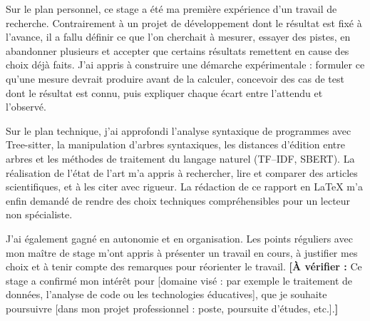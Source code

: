 \documentclass[12pt,a4paper,oneside]{report}
\newcommand{\averifier}[1]{\textcolor{orange!85!black}{\textbf{[À vérifier :} #1\textbf{]}}}
\begin{document}
Sur le plan personnel, ce stage a été ma première expérience d'un travail de
recherche. Contrairement à un projet de développement dont le résultat est
fixé à l'avance, il a fallu définir ce que l'on cherchait à mesurer, essayer
des pistes, en abandonner plusieurs et accepter que certains résultats
remettent en cause des choix déjà faits. J'ai appris à construire une
démarche expérimentale : formuler ce qu'une mesure devrait produire avant
de la calculer, concevoir des cas de test dont le résultat est connu, puis
expliquer chaque écart entre l'attendu et l'observé.

Sur le plan technique, j'ai approfondi l'analyse syntaxique de programmes
avec Tree-sitter, la manipulation d'arbres syntaxiques, les distances
d'édition entre arbres et les méthodes de traitement du langage naturel
(TF--IDF, SBERT). La réalisation de l'état de l'art m'a appris à rechercher,
lire et comparer des articles scientifiques, et à les citer avec rigueur.
La rédaction de ce rapport en \LaTeX{} m'a enfin demandé de rendre des
choix techniques compréhensibles pour un lecteur non spécialiste.

J'ai également gagné en autonomie et en organisation. Les points réguliers
avec mon maître de stage m'ont appris à présenter un travail en cours, à
justifier mes choix et à tenir compte des remarques pour réorienter le
travail. \averifier{Ce stage a confirmé mon intérêt pour [domaine visé :
par exemple le traitement de données, l'analyse de code ou les
technologies éducatives], que je souhaite poursuivre [dans mon projet
professionnel : poste, poursuite d'études, etc.].}

\printbibliography[heading=bibintoc,nottype=online,title={Bibliographie}]
\printbibliography[heading=subbibintoc,type=online,title={Webographie}]
\end{document}
